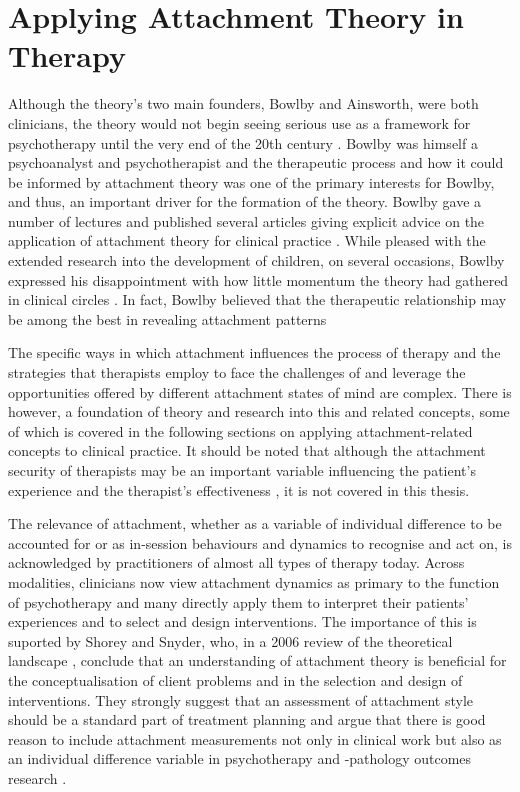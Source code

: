 \documentclass[12pt]{report}
\begin{document}
\section{Applying Attachment Theory in Therapy}
\label{sec:Applying attachment in therapy}
Although the theory's two main founders, Bowlby and Ainsworth, were both clinicians, the theory would not begin seeing serious use as a framework for psychotherapy until the very end of the 20th century \cite{Slade2019}.
Bowlby was himself a psychoanalyst and psychotherapist and the therapeutic process and how it could be informed by attachment theory was one of the primary interests for Bowlby, and thus, an important driver for the formation of the theory.
Bowlby gave a number of lectures and published several articles giving explicit advice on the application of attachment theory for clinical practice \cite{Bowlby2005b}.
While pleased with the extended research into the development of children, on several occasions, Bowlby expressed his disappointment with how little momentum the theory had gathered in clinical circles \cite{Bowlby1988}.
In fact, Bowlby believed that the therapeutic relationship may be among the best in revealing attachment patterns \cite{Bowlby1988}

The specific ways in which attachment influences the process of therapy and the strategies that therapists employ to face the challenges of and leverage the opportunities offered by different attachment states of mind are complex.
There is however, a foundation of theory and research into this and related concepts, some of which is covered in the following sections on applying attachment-related concepts to clinical practice.
It should be noted that although the attachment security of therapists may be an important variable influencing the patient's experience and the therapist's effectiveness \cite{Mikulincer2013, Daniel2006, Dozier1994, Cologon2017, Talia2020}, it is not covered in this thesis.

The relevance of attachment, whether as a variable of individual difference to be accounted for or as in-session behaviours and dynamics to recognise and act on, is acknowledged by practitioners of almost all types of therapy today.
Across modalities, clinicians now view attachment dynamics as primary to the function of psychotherapy and many directly apply them to interpret their patients' experiences and to select and design interventions.
The importance of this is suported by Shorey and Snyder, who, in a 2006 review of the theoretical landscape \cite{Shorey2006}, conclude that an understanding of attachment theory is beneficial for the conceptualisation of client problems and in the selection and design of interventions.
They strongly suggest that an assessment of attachment style should be a standard part of treatment planning and argue that there is good reason to include attachment measurements not only in clinical work but also as an individual difference variable in psychotherapy and -pathology outcomes research \cite{Shorey2006}.
\end{document}
